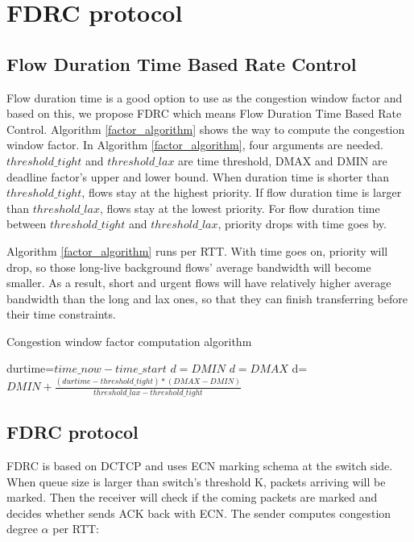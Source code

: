\documentclass[10pt, conference, letterpaper]{IEEEtran}
\begin{document}
\section{FDRC protocol} \label{protocol}

\subsection{Flow Duration Time Based Rate Control}
Flow duration time is a good option to use as the congestion window factor and based on this, we propose  FDRC which means Flow Duration Time Based Rate Control.
Algorithm \ref{factor_algorithm} shows the way to compute the congestion window factor.
In Algorithm \ref{factor_algorithm}, four arguments are needed. 
$threshold\_tight$ and $threshold\_lax$ are time threshold,
DMAX and DMIN are deadline factor's upper and lower bound. 
When duration time is shorter than $threshold\_tight$, flows stay at the highest priority.  
If flow duration time is larger than $threshold\_lax$, flows stay at the lowest priority.
For flow duration time between $threshold\_tight$ and $threshold\_lax$,  priority drops with time goes by.

Algorithm \ref{factor_algorithm} runs per RTT. 
With time goes on,  priority will drop, so those long-live background flows' average bandwidth will become
smaller. As a result, short and urgent flows will have relatively higher
average bandwidth than the long and lax ones, so that they can finish transferring before their time constraints.



\begin{algorithm}[h]  
    \caption{Congestion window factor computation algorithm} 
    \begin{algorithmic}[1] \label{factor_algorithm}     
   \STATE durtime=$time\_now-time\_start  $      
    \STATE $d=DMIN$
    \STATE $d=DMAX$
 \ELSE
  \STATE d=$DMIN+\frac{(durtime-threshold\_tight)*(DMAX-DMIN)}{threshold\_lax-threshold\_tight}$
 \ENDIF       
    \end{algorithmic}
\end{algorithm} 
\subsection{FDRC protocol}


FDRC is based on DCTCP and uses ECN marking schema at the switch side. 
When queue size is larger than switch's threshold K, packets arriving will be marked. 
Then the receiver will check if the coming packets are marked and decides whether sends ACK back with ECN.
The sender computes congestion degree $\alpha$ per RTT:
\end{document}
